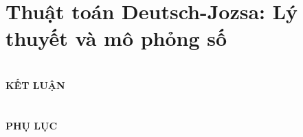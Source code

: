 \documentclass[12pt, a4paper, oneside]{report}
\theoremstyle{mycustomstyle}
\begin{document}
\chapter{Thuật toán Deutsch-Jozsa: Lý thuyết và mô phỏng số}


\chapter*{}
\begin{center}
    {\fontsize{20}{24}\selectfont\bfseries KẾT LUẬN}
\end{center}
\vspace{1cm}


\chapter*{}


\chapter*{}
\begin{center}
    {\fontsize{20}{24}\selectfont\bfseries PHỤ LỤC}
\end{center}
\fancyhead[L,R]{} %

\end{document}
